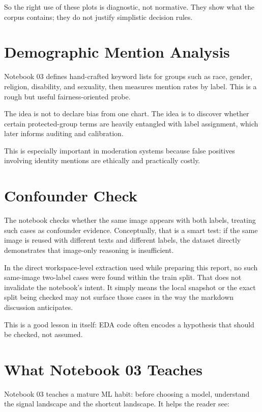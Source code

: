 \documentclass[11pt,a4paper]{report}
\begin{document}
So the right use of these plots is diagnostic, not normative. They show what the corpus contains; they do not justify simplistic decision rules.

\section{Demographic Mention Analysis}

Notebook 03 defines hand-crafted keyword lists for groups such as race, gender, religion, disability, and sexuality, then measures mention rates by label. This is a rough but useful fairness-oriented probe.

The idea is not to declare bias from one chart. The idea is to discover whether certain protected-group terms are heavily entangled with label assignment, which later informs auditing and calibration.

This is especially important in moderation systems because false positives involving identity mentions are ethically and practically costly.

\section{Confounder Check}

The notebook checks whether the same image appears with both labels, treating such cases as confounder evidence. Conceptually, that is a smart test: if the same image is reused with different texts and different labels, the dataset directly demonstrates that image-only reasoning is insufficient.

In the direct workspace-level extraction used while preparing this report, no such same-image two-label cases were found within the train split. That does not invalidate the notebook's intent. It simply means the local snapshot or the exact split being checked may not surface those cases in the way the markdown discussion anticipates.

This is a good lesson in itself: EDA code often encodes a hypothesis that should be checked, not assumed.

\section{What Notebook 03 Teaches}

Notebook 03 teaches a mature ML habit: before choosing a model, understand the signal landscape and the shortcut landscape. It helps the reader see:
\end{document}
